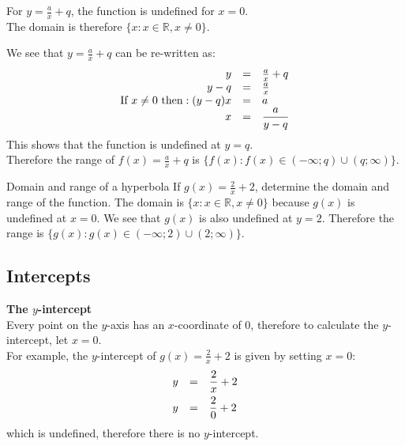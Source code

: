 For $y=\frac{a}{x}+q$, the function is undefined for $x=0$. \\
The domain is therefore $\{x:x\in \mathbb{R},x\ne 0\}$.\par 
We see that $y=\frac{a}{x}+q$ can be re-written as:
\begin{equation*}
\begin{array}{ccc}\hfill y& =& \frac{a}{x}+q\hfill \\
 \hfill y-q& =& \frac{a}{x}\hfill \\
 \hfill \mbox{If }x \ne  0 \mbox{ then}:(y-q)x& =& a\hfill \\
 \hfill x& =& \dfrac{a}{y-q}\hfill 
\end{array}
\end{equation*}
This shows that the function is undefined at $y=q$. \\
Therefore the range of $f(x)=\frac{a}{x}+q$ is $\{f(x):f(x)\in (-\infty ;q)\cup (q;\infty )\}$.\par 

\begin{wex}{Domain and range of a hyperbola}
{If $g(x)=\frac{2}{x}+2$, determine the domain and range of the function.}
{
The domain is $\{x:x\in \mathbb{R},x\ne 0\}$ because $g(x)$ is undefined at $x=0$.
We see that $g(x)$ is also undefined at $y=2$. Therefore the range is $\{g(x):g(x)\in (-\infty ;2)\cup (2;\infty )\}$.
}
\end{wex}


\subsection*{Intercepts}

\textbf{The $y$-intercept} \\
Every point on the $y$-axis has an $x$-coordinate of $0$, therefore to calculate the $y$-intercept, let $x=0$.\\
For example, the $y$-intercept of $g(x)=\frac{2}{x}+2$ is given by setting $x=0$:
\begin{equation*}
\begin{array}{ccc}\hfill y& =& \dfrac{2}{x}+2\hfill \vspace{4pt}\\
 \hfill y& =& \dfrac{2}{0}+2\hfill 
\end{array}
\end{equation*}
which is undefined, therefore there is no $y$-intercept.\\
\\


